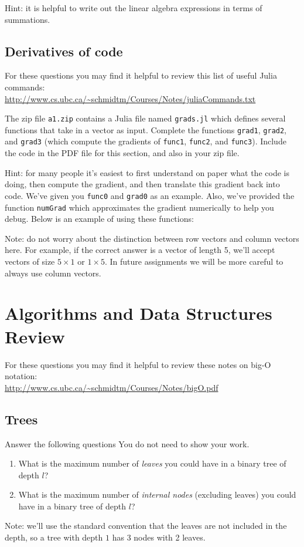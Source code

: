 \documentclass{article}
\def\blu#1{{\color{blu}#1}}
\begin{document}
Hint: it is helpful to write out the linear algebra expressions in terms of summations.



\subsection{Derivatives of code}

For these questions you may find it helpful to review this list of useful Julia commands:\\
\url{http://www.cs.ubc.ca/~schmidtm/Courses/Notes/juliaCommands.txt}

The zip file \texttt{a1.zip} contains a Julia file named \texttt{grads.jl} which defines several functions that take in a vector as input. \blu{Complete the functions \texttt{grad1}, \texttt{grad2}, and \texttt{grad3} (which compute the gradients of \texttt{func1}, \texttt{func2}, and \texttt{func3})}. Include the code in the PDF file for this section, and also in your zip file.

Hint: for many people it's easiest to first understand on paper what the code is doing, then compute
the gradient, and then translate this gradient back into code. We've given you \texttt{func0} and \texttt{grad0} as an example. Also, we've provided the function \texttt{numGrad} which approximates the gradient numerically to help you debug. Below is an example of using these functions:

Note: do not worry about the distinction between row vectors and column vectors here.
For example, if the correct answer is a vector of length 5, we'll accept vectors of size $5 \times 1$ or $1 \times 5$. In future assignments we will be more careful to always use column vectors.

\section{Algorithms and Data Structures Review}

For these questions you may find it helpful to review these notes on big-O notation:\\
\url{http://www.cs.ubc.ca/~schmidtm/Courses/Notes/bigO.pdf}

\subsection{Trees}

\blu{Answer the following questions} You do not need to show your work.
\begin{enumerate}
\item What is the maximum number of \emph{leaves} you could have in a binary tree of depth $l$?
\item What is the maximum number of \emph{internal nodes} (excluding leaves) you could have in a binary tree of depth $l$?
\end{enumerate}
Note: we'll use the standard convention that the leaves are not included in the depth, so a tree with depth $1$ has 3 nodes with 2 leaves.
\end{document}
